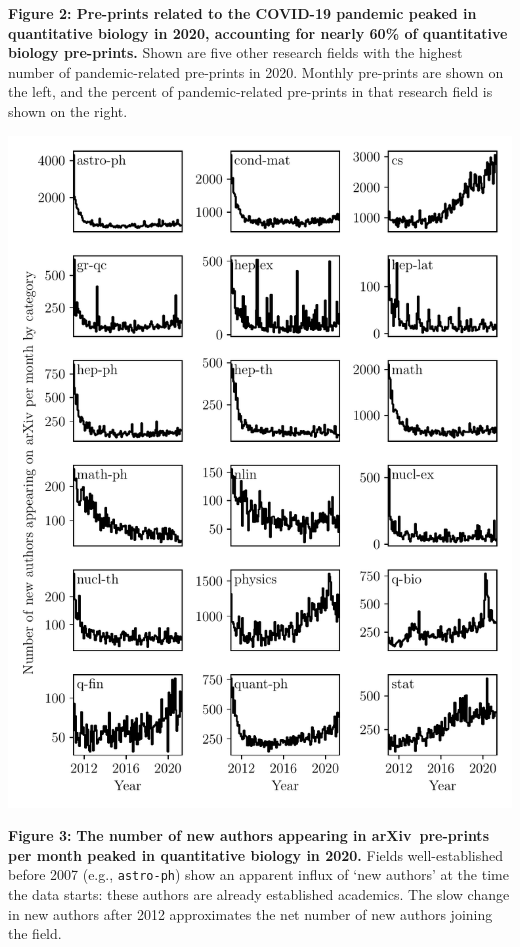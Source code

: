 \documentclass[a4paper,12pt]{article}
\newcommand{\arxiv}{arXiv}
\begin{document}
\noindent \textbf{Figure 2: Pre-prints related to the COVID-19 pandemic peaked in quantitative biology in 2020, accounting for nearly 60\% of quantitative biology pre-prints.} Shown are five other research fields with the highest number of pandemic-related pre-prints in 2020. Monthly pre-prints are shown on the left, and the percent of pandemic-related pre-prints in that research field is shown on the right.

\newpage

\begin{center}
	\includegraphics[width=0.95\linewidth]{new-authors-segmented-by-field}
\end{center}

\noindent \textbf{Figure 3:} \textbf{The number of new authors appearing in \arxiv\ pre-prints per month peaked in quantitative biology in 2020.} Fields well-established before 2007 (e.g., \texttt{astro-ph}) show an apparent influx of `new authors' at the time the data starts: these authors are already established academics. The slow change in new authors after 2012 approximates the net number of new authors joining the field.
\end{document}
